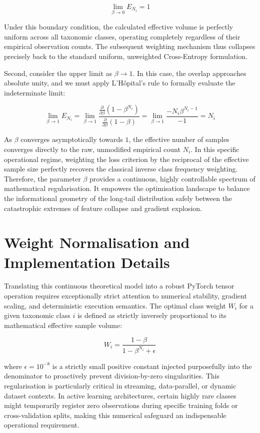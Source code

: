 \[
  \lim_{\beta \to 0} E_{N_i} = 1
\]

Under this boundary condition, the calculated effective volume is perfectly uniform across all taxonomic classes, operating completely regardless of their empirical observation counts. The subsequent weighting mechanism thus collapses precisely back to the standard uniform, unweighted Cross-Entropy formulation.

Second, consider the upper limit as $\beta \to 1$. In this case, the overlap approaches absolute unity, and we must apply L'Hôpital's rule to formally evaluate the indeterminate limit:

\[
  \lim_{\beta \to 1} E_{N_i} = \lim_{\beta \to 1} \frac{\frac{\partial}{\partial \beta}(1 - \beta^{N_i})}{\frac{\partial}{\partial \beta}(1 - \beta)} = \lim_{\beta \to 1} \frac{-N_i \beta^{N_i - 1}}{-1} = N_i
\]

As $\beta$ converges asymptotically towards $1$, the effective number of samples converges directly to the raw, unmodified empirical count $N_i$. In this specific operational regime, weighting the loss criterion by the reciprocal of the effective sample size perfectly recovers the classical inverse class frequency weighting. Therefore, the parameter $\beta$ provides a continuous, highly controllable spectrum of mathematical regularisation. It empowers the optimisation landscape to balance the informational geometry of the long-tail distribution safely between the catastrophic extremes of feature collapse and gradient explosion.

\section{Weight Normalisation and Implementation Details}
\label{sec:cb_pytorch_implementation}

Translating this continuous theoretical model into a robust PyTorch tensor operation requires exceptionally strict attention to numerical stability, gradient scaling, and deterministic execution semantics. The optimal class weight $W_i$ for a given taxonomic class $i$ is defined as strictly inversely proportional to its mathematical effective sample volume:

\[
  W_i = \frac{1 - \beta}{1 - \beta^{N_i} + \epsilon}
\]

where $\epsilon = 10^{-8}$ is a strictly small positive constant injected purposefully into the denominator to proactively prevent division-by-zero singularities. This regularisation is particularly critical in streaming, data-parallel, or dynamic dataset contexts. In active learning architectures, certain highly rare classes might temporarily register zero observations during specific training folds or cross-validation splits, making this numerical safeguard an indispensable operational requirement.

